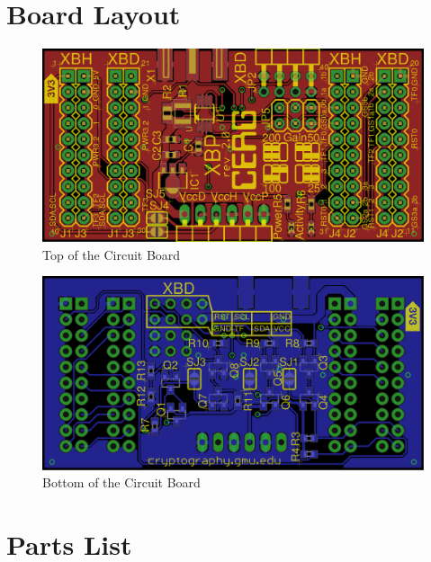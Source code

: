 \documentclass[twoside,11pt]{cergdoc}
\begin{document}
\begin{appendix}
\chapter{Board Layout}\label{sec:board}
\begin{figure}[ht]
  \begin{center}
    \includegraphics[scale=0.25]{figures/XBP-top}
    \caption{Top of the Circuit Board}
  \end{center}
\end{figure}

\begin{figure}[ht]
  \begin{center}
    \includegraphics[scale=0.25]{figures/XBP-bottom}
    \caption{Bottom of the Circuit Board}
  \end{center}
\end{figure}
\chapter{Parts List}\label{sec:parts}


\end{appendix}
\end{document}
